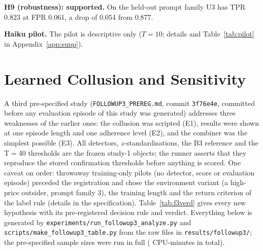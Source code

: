 \documentclass[11pt]{article}
\begin{document}
\textbf{H9 (robustness): supported.} On the held-out prompt family U3 has TPR 0.823 at FPR 0.061, a drop of 0.054 from 0.877.
\begin{table}[t]\centering\small\resizebox{\linewidth}{!}{}\caption{Confirmation study on fresh seeds (1450 test episodes), frozen detectors and thresholds. TPR/FPR at the 5\%-FPR validation threshold; right columns are per-mechanism TPR for the four original and three new mechanisms.}\label{tab:confirm}\end{table}
\textbf{Haiku pilot.} The pilot is descriptive only ($T{=}10$; details and Table~\ref{tab:pilot} in Appendix~\ref{app:supp}).

\section{Learned Collusion and Sensitivity}\label{sec:f3}
A third pre-specified study (\texttt{FOLLOWUP3\_PREREG.md}, commit \texttt{3f76e4e}, committed before any evaluation episode of this study was generated) addresses three weaknesses of the earlier ones: the collusion was scripted (E1), results were shown at one episode length and one adherence level (E2), and the combiner was the simplest possible (E3). All detectors, $z$-standardisations, the B3 reference and the T$=$40 thresholds are the frozen study-1 objects; the runner asserts that they reproduce the stored confirmation thresholds before anything is scored. One caveat on order: throwaway training-only pilots (no detector, score or evaluation episode) preceded the registration and chose the environment variant (a high-price outsider, prompt family 3), the training length and the return criterion of the label rule (details in the specification). Table~\ref{tab:f3verd} gives every new hypothesis with its pre-registered decision rule and verdict. Everything below is generated by \texttt{experiments/run\_followup3\_analyze.py} and \texttt{scripts/make\_followup3\_table.py} from the raw files in \texttt{results/followup3/}; the pre-specified sample sizes were run in full (\fCpuTotal{} CPU-minutes in total).
\begin{table}[t]\centering\small\resizebox{\linewidth}{!}{}
\caption{Hypotheses H10--H15 of the third study: pre-registered decision rule, observed value (point estimate [95\% CI]) and verdict. H10--H12 are inconclusive by rule because fewer than 8 jointly trained pairs met the label rule.}\label{tab:f3verd}\end{table}
\end{document}
